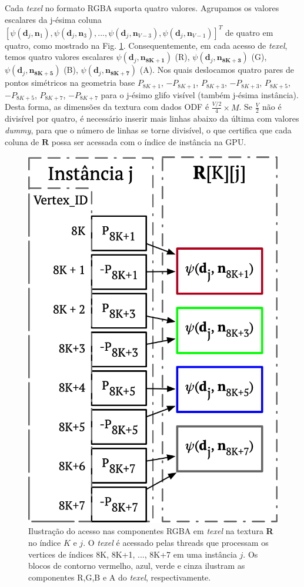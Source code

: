 Cada \textit{texel} no formato RGBA suporta quatro valores. Agrupamos os valores escalares da j-ésima coluna $[
\psi(\mathbf{d}_{j}, \mathbf{n}_1),
\psi(\mathbf{d}_{j}, \mathbf{n}_3), ...,
\psi(\mathbf{d}_{j}, \mathbf{n}_{V-3}),
\psi(\mathbf{d}_{j}, \mathbf{n}_{V-1})
]^T$ de quatro em quatro, como mostrado na Fig. \ref{fig::texelfetch}. Consequentemente, em cada acesso de \textit{texel}, temos quatro valores escalares $
\psi(\mathbf{d}_{j}, \mathbf{\mathbf{n}_{8K+1}})$ (R), $
\psi(\mathbf{d}_{j}, \mathbf{\mathbf{n}_{8K+3}})$ (G), $
\psi(\mathbf{d}_{j}, \mathbf{\mathbf{n}_{8K+5}})$ (B), $
\psi(\mathbf{d}_{j}, \mathbf{\mathbf{n}_{8K+7}})$ (A). Nos quais deslocamos quatro pares de pontos simétricos na geometria base $P_{8K+1}$, $-P_{8K+1}$, $P_{8K+3}$, $-P_{8K+3}$, $P_{8K+5}$, $-P_{8K+5}$, $P_{8K+7}$, $-P_{8K+7}$ para o j-ésimo glifo visível (também j-ésima instância). Desta forma, as dimensões da textura com dados ODF é $ \frac{V/2}{4} \times M$. Se $\frac{V}{2}$ não é divisível por quatro, é necessário inserir mais linhas abaixo da última com valores \textit{dummy}, para que o número de linhas se torne divisível, o que certifica que cada coluna de $\mathbf{R}$ possa ser acessada com o índice de instância na GPU.

\begin{figure}[ht]
    \centering
    \includegraphics[width=.45\linewidth, angle=0]{figs/Esquema_Glifo/texellookup.png}
    \caption{Ilustração do acesso nas componentes RGBA em \textit{texel} na textura \textbf{R} no índice $K$ e $j$. O \textit{texel} é acessado pelas threads que processam os vertices de índices 8K, 8K+1, ..., 8K+7 em uma instância $j$. Os blocos de contorno vermelho, azul, verde e cinza ilustram as componentes R,G,B e A do \textit{texel}, respectivamente.}
    \label{fig::texelfetch}
\end{figure}

